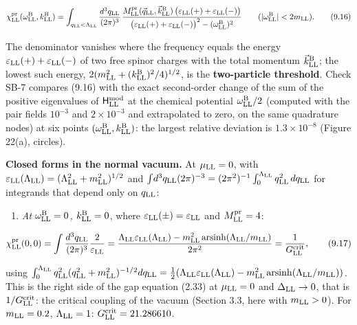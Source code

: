 \documentclass[
  10pt,
]{article}
\providecommand{\tightlist}{%
  \setlength{\itemsep}{0pt}\setlength{\parskip}{0pt}}
\begin{document}
\[\chi^{\rm pr}_{\rm LL}(\omega^{\rm B}_{\rm LL},k^{\rm B}_{\rm LL})=\int_{q_{\rm LL}<\Lambda_{\rm LL}}\frac{d^3q_{\rm LL}}{(2\pi)^3}\,\frac{M^{\rm pr}_{\rm LL}(\vec q_{\rm LL},\vec k^{\rm B}_{\rm LL})\,\big(\varepsilon_{\rm LL}(+)+\varepsilon_{\rm LL}(-)\big)}{\big(\varepsilon_{\rm LL}(+)+\varepsilon_{\rm LL}(-)\big)^2-(\omega^{\rm B}_{\rm LL})^2}\qquad(\lvert\omega^{\rm B}_{\rm LL}\rvert<2m_{\rm LL}).\tag{9.16}\]

The denominator vanishes where the frequency equals the energy
\(\varepsilon_{\rm LL}(+)+\varepsilon_{\rm LL}(-)\) of two free spinor
charges with the total momentum \(\vec k^{\rm B}_{\rm LL}\); the lowest
such energy, \(2(m_{\rm LL}^2+(k^{\rm B}_{\rm LL})^2/4)^{1/2}\), is the
\textbf{two-particle threshold}. Check SB-7 compares (9.16) with the
exact second-order change of the sum of the positive eigenvalues of
\(\mathsf H^{\rm mod}_{\rm LL}\) at the chemical potential
\(\omega^{\rm B}_{\rm LL}/2\) (computed with the pair fields \(10^{-3}\)
and \(2\times10^{-3}\) and extrapolated to zero, on the same quadrature
nodes) at six points \((\omega^{\rm B}_{\rm LL},k^{\rm B}_{\rm LL})\):
the largest relative deviation is \(1.3\times10^{-8}\) (Figure 22(a),
circles).

\textbf{Closed forms in the normal vacuum.} At \(\mu_{\rm LL}=0\), with
\(\varepsilon_{\rm LL}(\Lambda_{\rm LL})=(\Lambda_{\rm LL}^2+m_{\rm LL}^2)^{1/2}\)
and
\(\int\!d^3q_{\rm LL}(2\pi)^{-3}=(2\pi^2)^{-1}\int_0^{\Lambda_{\rm LL}}q_{\rm LL}^2\,dq_{\rm LL}\)
for integrands that depend only on \(q_{\rm LL}\):

\begin{enumerate}
\def\labelenumi{(\roman{enumi})}
\tightlist
\item
  \emph{At \(\omega^{\rm B}_{\rm LL}=0\), \(k^{\rm B}_{\rm LL}=0\)},
  where \(\varepsilon_{\rm LL}(\pm)=\varepsilon_{\rm LL}\) and
  \(M^{\rm pr}_{\rm LL}=4\):
\end{enumerate}

\[\chi^{\rm pr}_{\rm LL}(0,0)=\int\frac{d^3q_{\rm LL}}{(2\pi)^3}\frac2{\varepsilon_{\rm LL}}=\frac{\Lambda_{\rm LL}\varepsilon_{\rm LL}(\Lambda_{\rm LL})-m_{\rm LL}^2\,\mathrm{arsinh}(\Lambda_{\rm LL}/m_{\rm LL})}{2\pi^2}=\frac1{G^{\rm crit}_{\rm LL}},\tag{9.17}\]

using
\(\int_0^{\Lambda_{\rm LL}}q_{\rm LL}^2(q_{\rm LL}^2+m_{\rm LL}^2)^{-1/2}dq_{\rm LL}=\tfrac12(\Lambda_{\rm LL}\varepsilon_{\rm LL}(\Lambda_{\rm LL})-m_{\rm LL}^2\,\mathrm{arsinh}(\Lambda_{\rm LL}/m_{\rm LL}))\).
This is the right side of the gap equation (2.33) at \(\mu_{\rm LL}=0\)
and \(\Delta_{\rm LL}\to0\), that is \(1/G^{\rm crit}_{\rm LL}\): the
critical coupling of the vacuum (Section 3.3, here with
\(m_{\rm LL}>0\)). For \(m_{\rm LL}=0.2\), \(\Lambda_{\rm LL}=1\):
\(G^{\rm crit}_{\rm LL}=21.286610\).
\end{document}
